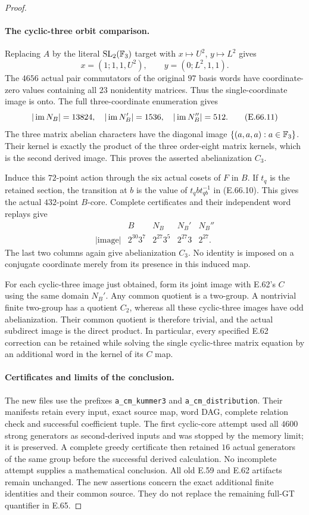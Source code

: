 \begin{proof}
\paragraph{The cyclic-three orbit comparison.}
Replacing $A$ by the literal $\mathrm{SL}_2(\mathbb F_3)$ target
with $x\mapsto U^2$, $y\mapsto L^2$ gives
\[
 x=(1;1,1,U^2),\qquad y=(0;L^2,1,1).
 \tag{E.66.10}
\]
The $4656$ actual pair commutators of the original $97$ basis
words have coordinate-zero values containing all $23$
nonidentity matrices. Thus the single-coordinate image is
onto. The full three-coordinate enumeration gives
\[
 |\operatorname{im} N_B|=13824,\quad |\operatorname{im} N_B'|=1536,
 \quad |\operatorname{im} N_B''|=512.
 \tag{E.66.11}
\]
The three matrix abelian characters have the diagonal image
$\{(a,a,a):a\in\mathbb F_3\}$. Their kernel is exactly the product
of the three order-eight matrix kernels, which is the second
derived image. This proves the asserted abelianization $C_3$.

Induce this $72$-point action through the six actual cosets
of $F$ in $B$. If $t_q$ is the retained section, the transition
at $b$ is the value of $t_qbt_{qb}^{-1}$ in
\textup{(E.66.10)}. This gives the actual $432$-point
$B$-core. Complete certificates and their independent word
replays give
\[
\begin{array}{c|rrrr}
 &B&N_B&N_B'&N_B''\\\hline
 |\mathrm{image}|&2^{30}3^7&2^{27}3^5&2^{27}3&2^{27}.
\end{array}
 \tag{E.66.12}
\]
The last two columns again give abelianization $C_3$.
No identity is imposed on a conjugate coordinate merely from
its presence in this induced map.

For each cyclic-three image just obtained, form its joint
image with E.62's $C$ using the same domain $N_B'$.
Any common quotient is a two-group. A nontrivial finite
two-group has a quotient $C_2$, whereas all these cyclic-three
images have odd abelianization. Their common quotient is
therefore trivial, and the actual subdirect image is the
direct product. In particular, every specified E.62 correction
can be retained while solving the single cyclic-three matrix
equation by an additional word in the kernel of its $C$ map.

\paragraph{Certificates and limits of the conclusion.}
The new files use the prefixes \texttt{a\_cm\_kummer3} and
\texttt{a\_cm\_distribution}. Their manifests retain every
input, exact source map, word DAG, complete relation check and
successful coefficient tuple. The first cyclic-core attempt
used all $4600$ strong generators as second-derived inputs
and was stopped by the memory limit; it is preserved. A
complete greedy certificate then retained $16$ actual
generators of the same group before the successful derived
calculation. No incomplete attempt supplies a mathematical
conclusion. All old E.59 and E.62 artifacts remain unchanged.
The new assertions concern the exact additional finite
identities and their common source. They do not replace the
remaining full-GT quantifier in E.65.
\end{proof}
